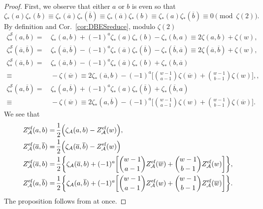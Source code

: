 \documentclass{article}
\newcommand{\Sy}{{\mathcal S}}
\newcommand{\calA}{\mathcal{A}}
\newcommand{\eff}{\text{\rm{ef}}}
\newcommand{\ol}{\overline}
\theoremstyle{plain}
\theoremstyle{definition}
\begin{document}
\begin{proof}
First, we observe that either $a$ or $b$ is even so that
\begin{equation*}
\zeta_\ast(a)\zeta_\ast(b)\equiv  \zeta_\ast(\ol{a})\zeta_\ast(\ol{b}) \equiv  \zeta_\ast(\ol{a})\zeta_\ast(b) \equiv  \zeta_\ast(a)\zeta_\ast(\ol{b}) \equiv  0 \pmod{\zeta(2)}.
\end{equation*}
By definition and Cor.~\ref{cor:DBESreduce}, modulo $\zeta(2)$
\begin{align*}
    \zeta_\ast^\Sy(a,b)=&\, \zeta_\ast(a,b)+(-1)^a \zeta_\ast(a)\zeta_\ast(b)-\zeta_\ast(b,a)\equiv2\zeta(a,b)+\zeta(w),\\
    \zeta_\ast^\Sy(\ol{a},\ol{b})=&\, \zeta_\ast(\ol{a},\ol{b})-(-1)^a \zeta_\ast(\ol{a})\zeta_\ast(\ol{b})-\zeta_\ast(\ol{b},\ol{a})\equiv2\zeta(\ol{a},\ol{b})+\zeta(w),\\
    \zeta_\ast^\Sy(\ol{a},b)=&\, \zeta_\ast(\ol{a},b)-(-1)^a \zeta_\ast(\ol{a})\zeta_\ast(b)+\zeta_\ast(b,\ol{a})\\
    \equiv &\, -\zeta(\ol{w})
    \equiv 2\zeta_\ast(\ol{a},b)-(-1)^a \bigg[\binom{w-1}{a-1}\zeta(\ol{w})+\binom{w-1}{b-1}\zeta(w)\bigg],,\\
    \zeta_\ast^\Sy(a,\ol{b})=&\, \zeta_\ast(a,\ol{b})+(-1)^a \zeta_\ast(a)\zeta_\ast(\ol{b})+\zeta_\ast(\ol{b},a)\\
   \equiv &\,  -\zeta(\ol{w})
    \equiv 2\zeta_\ast(a,\ol{b})- (-1)^a \bigg[\binom{w-1}{a-1}\zeta(w)+\binom{w-1}{b-1}\zeta(\ol{w})\bigg].
\end{align*}
We see that
\begin{align*}
Z_\calA^\eff(a,b)= &\, \frac12 \Big( \zeta_\calA(a,b)-Z_\calA^\eff(w)\Big),\\
Z_\calA^\eff(\ol{a},\ol{b})= &\, \frac12 \Big( \zeta_\calA(\ol{a},\ol{b})-Z_\calA^\eff(w) \Big)\\
Z_\calA^\eff(\ol{a},b)= &\,\frac12\bigg\{\zeta_\calA(\ol{a},b)+(-1)^a \bigg[\binom{w-1}{a-1}Z_\calA^\eff(\ol{w})+\binom{w-1}{b-1}Z_\calA^\eff(w)\bigg]\bigg\},\\
Z_\calA^\eff(a,\ol{b})= &\,\frac12\bigg\{\zeta_\calA(a,\ol{b})+(-1)^a \bigg[\binom{w-1}{a-1}Z_\calA^\eff(w)+\binom{w-1}{b-1}Z_\calA^\eff(\ol{w})\bigg]\bigg\}.
\end{align*}
The proposition follows from \cite[Thm. 8.6.4]{Zhao2016} at once.
\end{proof}
\end{document}
